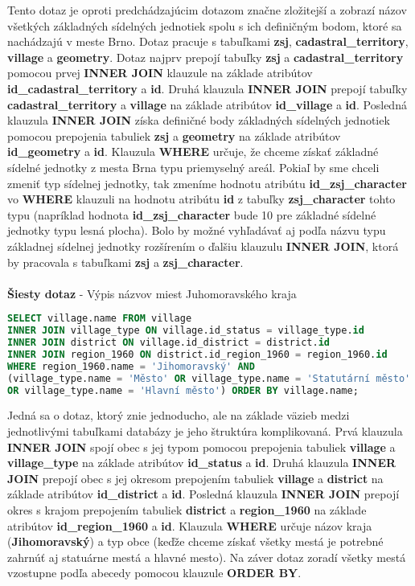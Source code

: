 Tento dotaz je oproti predchádzajúcim dotazom značne zložitejší a zobrazí názov všetkých základných sídelných jednotiek spolu s ich definičným bodom, ktoré sa nachádzajú v meste Brno. Dotaz pracuje s tabuľkami {\bf zsj}, {\bf cadastral\_territory}, {\bf village} a {\bf geometry}. Dotaz najprv prepojí tabuľky {\bf zsj} a {\bf cadastral\_territory} pomocou prvej {\bf INNER JOIN} klauzule na základe atribútov {\bf id\_cadastral\_territory} a {\bf id}. Druhá klauzula {\bf INNER JOIN} prepojí tabuľky {\bf cadastral\_territory} a {\bf village} na základe atribútov {\bf id\_village} a {\bf id}. Posledná klauzula {\bf INNER JOIN} získa definičné body základných sídelných jednotiek pomocou prepojenia tabuliek {\bf zsj} a {\bf geometry} na základe atribútov {\bf id\_geometry} a {\bf id}. Klauzula {\bf WHERE} určuje, že chceme získať základné sídelné jednotky z mesta Brna typu priemyselný areál. Pokiaľ by sme chceli zmeniť typ sídelnej jednotky, tak zmeníme hodnotu atribútu {\bf id\_zsj\_character} vo {\bf WHERE} klauzuli na hodnotu atribútu {\bf id} z tabuľky {\bf zsj\_character} tohto typu (napríklad hodnota {\bf id\_zsj\_character} bude 10 pre základné sídelné jednotky typu lesná plocha). Bolo by možné vyhľadávať aj podľa názvu typu základnej sídelnej jednotky rozšírením o ďalšiu klauzulu {\bf INNER JOIN}, ktorá by pracovala s tabuľkami {\bf zsj} a {\bf zsj\_character}. \\\\
{\bf Šiesty dotaz} - Výpis názvov miest Juhomoravského kraja
\begin{lstlisting}[language=SQL]
SELECT village.name FROM village 
INNER JOIN village_type ON village.id_status = village_type.id 
INNER JOIN district ON village.id_district = district.id 
INNER JOIN region_1960 ON district.id_region_1960 = region_1960.id 
WHERE region_1960.name = 'Jihomoravský' AND 
(village_type.name = 'Město' OR village_type.name = 'Statutární město' 
OR village_type.name = 'Hlavní město') ORDER BY village.name;
\end{lstlisting}
Jedná sa o dotaz, ktorý znie jednoducho, ale na základe väzieb medzi jednotlivými tabuľkami databázy je jeho štruktúra komplikovaná. Prvá klauzula {\bf INNER JOIN} spojí obec s jej typom pomocou prepojenia tabuliek {\bf village} a {\bf village\_type} na základe atribútov {\bf id\_status} a {\bf id}. Druhá klauzula {\bf INNER JOIN} prepojí obec s jej okresom prepojením tabuliek {\bf village} a {\bf district} na základe atribútov {\bf id\_district} a {\bf id}. Posledná klauzula {\bf INNER JOIN} prepojí okres s krajom prepojením tabuliek {\bf district} a {\bf region\_1960} na základe atribútov {\bf id\_region\_1960} a {\bf id}. Klauzula {\bf WHERE} určuje názov kraja ({\bf Jihomoravský}) a typ obce (keďže chceme získať všetky mestá je potrebné zahrnúť aj statuárne mestá a hlavné mesto). Na záver dotaz zoradí všetky mestá vzostupne podľa abecedy pomocou klauzule {\bf ORDER BY}.
